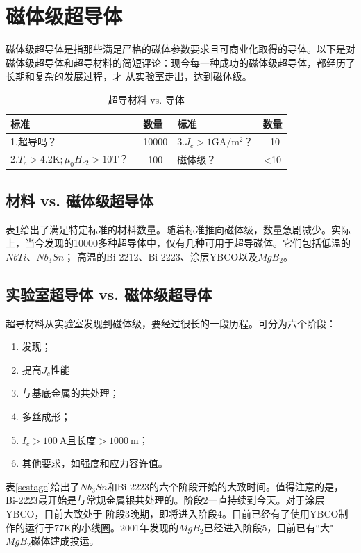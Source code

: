 \section{磁体级超导体}
磁体级超导体是指那些满足严格的磁体参数要求且可商业化取得的导体。以下是对磁体级超导体和超导材料的简短评论：现今每一种成功的磁体级超导体，都经历了长期和复杂的发展过程，才
从实验室走出，达到磁体级。
\begin{table}[htbp]\small
  \centering
  \caption{超导材料 vs. 导体} \label{scmaterialvsconductor}
\begin{tabular}{|l|c||l|c|}
  \hline
  标准 & 数量 & 标准 & 数量 \\ \hline \hline
  1.超导吗？ & ~10000 & 3.$J_c>1\mathrm{GA/m^2}$？ & ~10 \\ \hline
  2.$T_c> 4.2\mathrm{K};\mu_0 H_{c2}>10\mathrm{T}$？ &~100 & 磁体级？ & <10 \\
  \hline
\end{tabular}
\end{table}

\subsection{材料 vs. 磁体级超导体}
表\ref{scmaterialvsconductor}给出了满足特定标准的材料数量。随着标准推向磁体级，数量急剧减少。实际上，当今发现的10000多种超导体中，仅有几种可用于超导磁体。它们包括低温的$NbTi$、$Nb_3Sn$；
高温的Bi-2212、Bi-2223、涂层YBCO以及$MgB_2$。

\subsection{实验室超导体 vs. 磁体级超导体}
超导材料从实验室发现到磁体级，要经过很长的一段历程。可分为六个阶段：
\begin{enumerate}
  \item 发现；
  \item 提高$J_c$性能
  \item 与基底金属的共处理；
  \item 多丝成形；
  \item $I_c>100\ \mathrm{A}$且长度$>1000\ \mathrm{m}$；
  \item 其他要求，如强度和应力容许值。
\end{enumerate}

表\ref{scstage}给出了$Nb_3Sn$和Bi-2223的六个阶段开始的大致时间。值得注意的是，Bi-2223最开始是与常规金属银共处理的。阶段2一直持续到今天。对于涂层YBCO，目前大致处于
阶段3晚期，即将进入阶段4。目前已经有了使用YBCO制作的运行于77K的小线圈。2001年发现的$MgB_2$已经进入阶段5，目前已有``大"$MgB_2$磁体建成投运。

